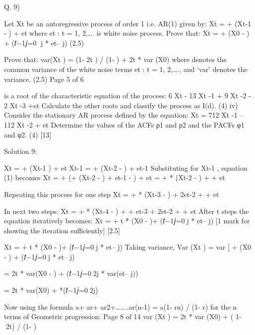 \documentclass[a4paper,12pt]{article}
\begin{document}


Q. 9)
\item  Let Xt be an autoregressive process of order 1 i.e. AR(1) given by:
Xt = \mu + \alpha (Xt-1 - \mu) + et
where {et : t = 1, 2,….} is white noise process.
Prove that:
Xt = \mu + \alphat * (X0 - \mu) + \Sum(𝑡−1𝑗=0 j * et– j)
(2.5)
\item   Prove that:
var(Xt ) =  (1- \alpha2t ) / (1- ) + \alpha 2t * var (X0)
where  denotes the common variance of the white noise terms {et : t = 1, 2,….}, and ‘var’ denotes the variance.
(2.5)
Page 5 of 6
\item   {} is a root of the characteristic equation of the process:
6 Xt - 13 Xt -1 + 9 Xt -2 - 2 Xt -3 +et
Calculate the other roots and classify the process as I(d).
(4)
iv) Consider the stationary AR process defined by the equation:
Xt = 712 Xt -1 – 112 Xt -2 + et
Determine the values of the ACFs ρ1 and ρ2 and the PACFs φ1 and φ2.
(4)
[13]


Solution 9:
\item 
Xt = \mu + \alpha (Xt-1 \mu) + et
Xt-1 = \mu + \alpha (Xt-2 - \mu) + et-1
Substituting for Xt-1 , equation (1) becomes
Xt = \mu + \alpha (\mu + \alpha (Xt-2 - \mu) + et-1 - \mu) + et
= \mu +  * (Xt-2 - \mu) +  + et

Repeating this process for one step
Xt = \mu +  * (Xt-3 - \mu) + \alpha2et-2 +  + et

In next two steps:
Xt = \mu + * (Xt-4 - \mu) + +  et-3 + \alpha2et-2 +  + et
After t steps the equation iteratively becomes:
Xt = \mu + \alpha t * (X0 - \mu)+ \Sum(𝑡−1𝑗=0j * et– j)
[1 mark for showing the iteration sufficiently]
[2.5]
\item  
Xt = \mu + \alpha t * (X0 - \mu)+ \Sum(𝑡−1𝑗=0j * et– j)
Taking variance,
Var (Xt ) = var [ \mu + \alphat * (X0 - \mu) + \Sum(𝑡−1𝑗=0j * et– j)

= \alpha2t * var(X0 - \mu) + \Sum(𝑡−1𝑗=02j * var(et– j))

= \alpha2t * var(X0) +  *\Sum(𝑡−1𝑗=02j)

Now using the formula a+ ar+ ar2+……..ar(n-1) = a(1- rn) / (1- r) for the n terms of Geometric progression:
Page 8 of 14
var (Xt ) = \alpha2t * var (X0) +  ( 1- 2t) / (1-  )
\end{document}
